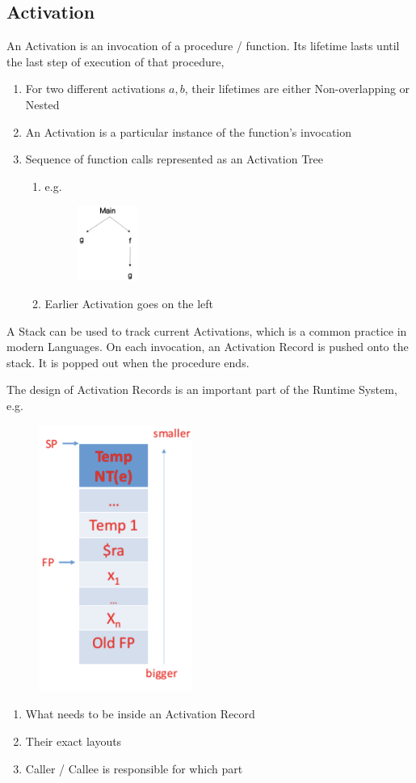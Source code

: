 \documentclass[a4paper]{exam}
\theoremstyle{definition}
\begin{document}
\subsection{Activation}
An Activation is an invocation of a procedure / function. Its lifetime lasts until the last step of execution of that procedure,
\begin{enumerate}
    \item For two different activations $a, b$, their lifetimes are either  Non-overlapping or Nested 
     \item An Activation is a particular instance of the function's invocation 
      \item Sequence of function calls represented as an Activation Tree
      \begin{enumerate}
      \item e.g.
      \begin{figure}[htbp]
  \includegraphics[width=2cm]{./img/main_activation.png}
\end{figure}
          \item Earlier Activation goes on the left
      \end{enumerate}
\end{enumerate}
A Stack can be used to track current Activations, which is a common practice in modern Languages. On each invocation, an Activation Record is pushed onto the stack. It is popped out when the procedure ends.

The design of Activation Records is an important part of the Runtime System, e.g.
\begin{figure}[htbp]
  \centering
  \includegraphics[width=5cm]{./img/fp_sp.png}
\end{figure}
\begin{enumerate}
    \item What needs to be inside an Activation Record
    \item Their exact layouts
 \item Caller / Callee is responsible for which part
\end{enumerate}
\end{document}
